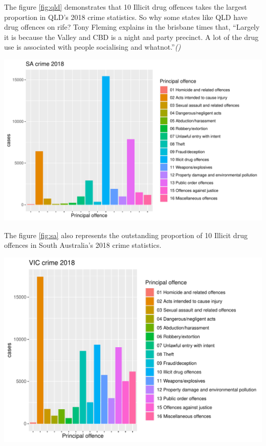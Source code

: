\documentclass[11pt,a4paper,]{article}
\let\origfigure\figure
\let\endorigfigure\endfigure
\renewenvironment{figure}[1][2] {
\expandafter\origfigure\expandafter[H]
} {
\endorigfigure
}
\begin{document}
The figure \ref{fig:qld} demonstrates that 10 Illicit drug offences takes the largest proportion in QLD's 2018 crime statistics. So why some states like QLD have drug offences on rife? Tony Fleming explains in the brisbane times that, ``Largely it is because the Valley and CBD is a night and party precinct. A lot of the drug use is associated with people socialising and whatnot.''\emph{(\textcite{brisbanetimes2019})}

\begin{figure}
\centering
\includegraphics{ETC5513-Assignment4_files/figure-latex/sa-1.pdf}
\caption{\label{fig:sa}SA crime 2018}
\end{figure}

The figure \ref{fig:sa} also represents the outstanding proportion of 10 Illicit drug offences in South Australia's 2018 crime statistics.

\begin{figure}
\centering
\includegraphics{ETC5513-Assignment4_files/figure-latex/vic-1.pdf}
\caption{\label{fig:vic}VIC crime 2018}
\end{figure}
\end{document}
